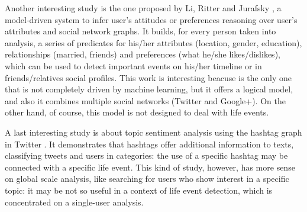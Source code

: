 Another interesting study is the one proposed by Li, Ritter and Jurafsky \cite{li2014inferring}, a model-driven system to infer user's attitudes or preferences reasoning over user's attributes and social network graphs. It builds, for every person taken into analysis, a series of predicates for his/her attributes (location, gender, education), relationships (married, friends) and preferences (what he/she likes/dislikes), which can be used to detect important events on his/her timeline or in friends/relatives social profiles. This work is interesting beacuse is the only one that is not completely driven by machine learning, but it offers a logical model, and also it combines multiple social networks (Twitter and Google+). On the other hand, of course, this model is not designed to deal with life events.

A last interesting study is about topic sentiment analysis using the hashtag graph in Twitter \cite{wang2011topic}. It demonstrates that hashtags offer additional information to texts, classifying tweets and users in categories: the use of a specific hashtag may be connected with a specific life event. This kind of study, however, has more sense on global scale analysis, like searching for users who show interest in a specific topic: it may be not so useful in a context of life event detection, which is concentrated on a single-user analysis.